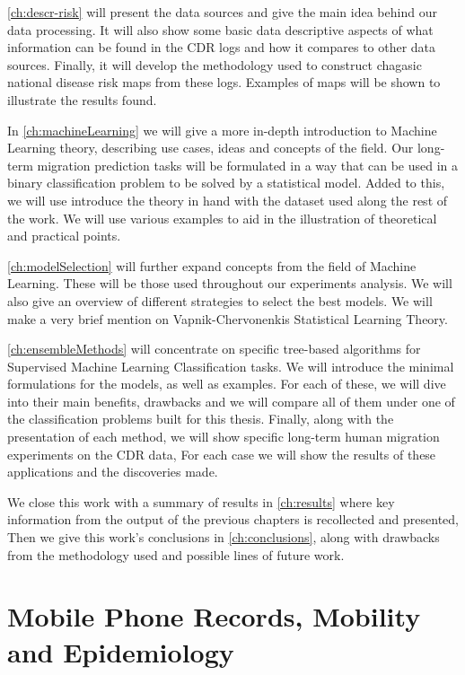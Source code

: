 
\cref{ch:descr-risk} will present the data sources and give the main idea behind our data processing. 
It will also show some basic data descriptive aspects of what information can be found in the CDR logs and how it compares to other data sources.
Finally, it will develop the methodology used to construct chagasic national disease risk maps from these logs.
Examples of maps will be shown to illustrate the results found.

In \cref{ch:machineLearning} we will give a more in-depth introduction to Machine Learning theory, describing use cases, ideas and concepts of the field.
Our long-term migration prediction tasks will be formulated in a way that can be used in a binary classification problem to be solved by a statistical model.
Added to this, we will use introduce the theory in hand with the dataset used along the rest of the work. 
We will use various examples to aid in the illustration of theoretical and practical points.

\cref{ch:modelSelection} will further expand concepts from the field of Machine Learning.
These will be those used throughout our experiments analysis.
We will also give an overview of different strategies to select the best models.
We will make a very brief mention on Vapnik-Chervonenkis Statistical Learning Theory.

\cref{ch:ensembleMethods} will concentrate on specific tree-based algorithms for Supervised Machine Learning Classification tasks.
We will introduce the minimal formulations for the models, as well as examples.
For each of these, we will dive into their main benefits, drawbacks and we will compare all of them under one of the classification problems built for this thesis.
Finally, along with the presentation of each method, we will show specific long-term human migration experiments on the CDR data,
For each case we will show the results of these applications and the discoveries made.

We close this work with a summary of results in \cref{ch:results} where key information from the output of the previous chapters is recollected and presented,
Then we give this work's conclusions in \cref{ch:conclusions}, along with drawbacks from the methodology used and possible lines of future work.


\section{Mobile Phone Records, Mobility and Epidemiology}

